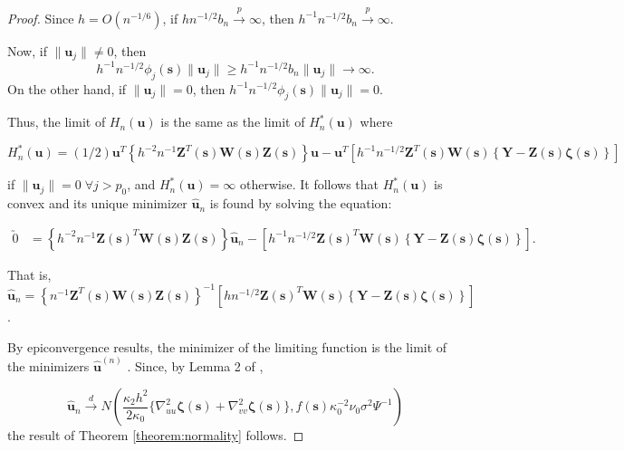 \documentclass[english]{article}\usepackage[]{graphicx}\usepackage[]{color}
\theoremstyle{plain}
\theoremstyle{plain}
\begin{document}
\begin{proof}
Since $h=O(n^{-1/6})$, if $hn^{-1/2}b_{n}\xrightarrow{p}\infty$,
then $h^{-1}n^{-1/2}b_{n}\xrightarrow{p}\infty$.

Now, if $\|\bm{u}_{j}\|\ne0$, then 
\[
h^{-1}n^{-1/2}\phi_{j}(\bm{s})\|\bm{u}_{j}\|\ge h^{-1}n^{-1/2}b_{n}\|\bm{u}_{j}\|\to\infty.
\]
On the other hand, if $\|\bm{u}_{j}\|=0$, then $h^{-1}n^{-1/2}\phi_{j}(\bm{s})\|\bm{u}_{j}\|=0$.

Thus, the limit of $H_{n}\left(\bm{u}\right)$ is the same as the
limit of $H_{n}^{*}\left(\bm{u}\right)$ where

\[
H_{n}^{*}\left(\bm{u}\right)=(1/2)\bm{u}^{T}\left\{ h^{-2}n^{-1}\bm{Z}^{T}(\bm{s})\bm{W}(\bm{s})\bm{Z}(\bm{s})\right\} \bm{u}-\bm{u}^{T}\left[h^{-1}n^{-1/2}\bm{Z}^{T}(\bm{s})\bm{W}(\bm{s})\left\{ \bm{Y}-\bm{Z}(\bm{s})\bm{\zeta}(\bm{s})\right\} \right]
\]


if $\|\bm{u}_{j}\|=0\;\forall j>p_{0}$, and $H_{n}^{*}\left(\bm{u}\right)=\infty$
otherwise. It follows that $H_{n}^{*}\left(\bm{u}\right)$ is convex
and its unique minimizer $\hat{\bm{u}}_{n}$ is found by solving the
equation:

\begin{align}
\utilde{0} & =\left\{ h^{-2}n^{-1}\bm{Z}\left(\bm{s}\right)^{T}\bm{W}\left(\bm{s}\right)\bm{Z}\left(\bm{s}\right)\right\} \hat{\bm{u}}_{n}-\left[h^{-1}n^{-1/2}\bm{Z}\left(\bm{s}\right)^{T}\bm{W}\left(\bm{s}\right)\left\{ \bm{Y}-\bm{Z}\left(\bm{s}\right)\bm{\zeta}\left(\bm{s}\right)\right\} \right].\label{eq:limit}
\end{align}


That is, $\hat{\bm{u}}_{n}=\left\{ n^{-1}\bm{Z}^{T}\left(\bm{s}\right)\bm{W}\left(\bm{s}\right)\bm{Z}\left(\bm{s}\right)\right\} ^{-1}\left[hn^{-1/2}\bm{Z}\left(\bm{s}\right)^{T}\bm{W}\left(\bm{s}\right)\left\{ \bm{Y}-\bm{Z}\left(\bm{s}\right)\bm{\zeta}\left(\bm{s}\right)\right\} \right]$.

By epiconvergence results, the minimizer of the limiting function
is the limit of the minimizers $\hat{\bm{u}}^{(n)}$ \citep{Geyer-1994,Knight-Fu-2000}.
Since, by Lemma 2 of \citet{Sun-Yan-Zhang-Lu-2014},

\begin{equation}
\hat{\bm{u}}_{n}\xrightarrow{d}N\left(\frac{\kappa_{2}h^{2}}{2\kappa_{0}}\{\nabla_{uu}^{2}\bm{\zeta}(\bm{s})+\nabla_{vv}^{2}\bm{\zeta}(\bm{s})\},f(\bm{s})\kappa_{0}^{-2}\nu_{0}\sigma^{2}\Psi^{-1}\right)
\end{equation}
the result of Theorem \ref{theorem:normality} follows.
\end{proof}
\end{document}
